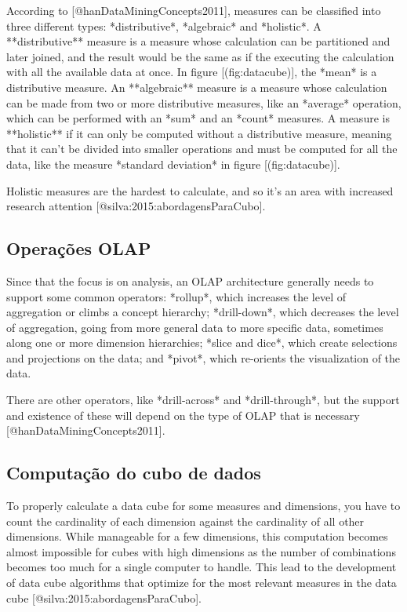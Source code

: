 According to [@hanDataMiningConcepts2011], measures can be classified into three different types: *distributive*, *algebraic* and *holistic*. A **distributive** measure is a measure whose calculation can be partitioned and later joined, and the result would be the same as if the executing the calculation with all the available data at once. In figure [\@ref(fig:datacube)], the *mean* is a distributive measure.
An **algebraic** measure is a measure whose calculation can be made from two or more distributive measures, like an *average* operation, which can be performed with an *sum* and an *count* measures.
A measure is **holistic** if it can only be computed without a distributive measure, meaning that it can't be divided into smaller operations and must be computed for all the data, like the measure *standard deviation* in figure [\@ref(fig:datacube)].

Holistic measures are the hardest to calculate, and so it's an area with increased research attention [@silva:2015:abordagensParaCubo].

\subsection{Operações OLAP}
\label{ch:fun:olap:ops}

Since that the focus is on analysis, an OLAP architecture generally needs to support some common operators: *rollup*, which increases the level of aggregation or climbs a concept hierarchy; *drill-down*, which decreases the level of aggregation, going from more general data to more specific data, sometimes along one or more dimension hierarchies; *slice and dice*, which create selections and projections on the data; and *pivot*, which re-orients the visualization of the data.

There are other operators, like *drill-across* and *drill-through*, but the support and existence of these will depend on the type of OLAP that is necessary [@hanDataMiningConcepts2011].

\subsection{Computação do cubo de dados}

To properly calculate a data cube for some measures and dimensions, you have to count the cardinality of each dimension against the cardinality of all other dimensions.
While manageable for a few dimensions, this computation becomes almost impossible for cubes with high dimensions as the number of combinations becomes too much for a single computer to handle.
This lead to the development of data cube algorithms that optimize for the most relevant measures in the data cube [@silva:2015:abordagensParaCubo].

